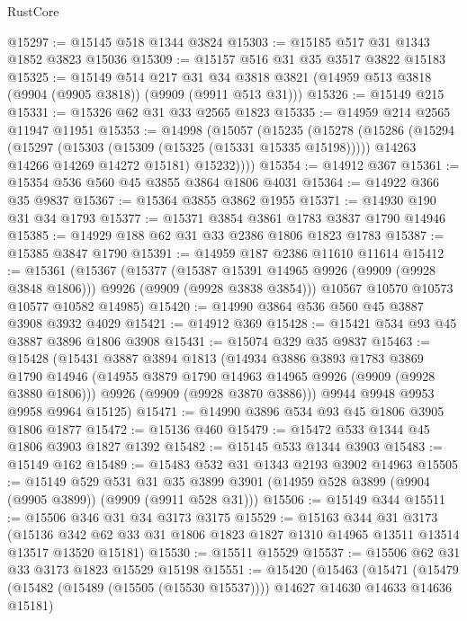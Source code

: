\begin{lexlean}{RustCore}
\begin{coremodule}
@15297 := @15145 @518 @1344 @3824
@15303 := @15185 @517 @31 @1343 @1852 @3823 @15036
@15309 := @15157 @516 @31 @35 @3517 @3822 @15183
@15325 := @15149
    @514
    @217
    @31
    @34
    @3818
    @3821
    (@14959 @513 @3818 (@9904 (@9905 @3818)) (@9909 (@9911 @513 @31)))
@15326 := @15149 @215
@15331 := @15326 @62 @31 @33 @2565 @1823
@15335 := @14959 @214 @2565 @11947 @11951
@15353 := @14998
    (@15057
      (@15235
        (@15278
          (@15286
            (@15294
              (@15297 (@15303 (@15309 (@15325 (@15331 @15335 @15198)))))
              @14263
              @14266
              @14269
              @14272
              @15181)
            @15232))))
@15354 := @14912 @367
@15361 := @15354 @536 @560 @45 @3855 @3864 @1806 @4031
@15364 := @14922 @366 @35 @9837
@15367 := @15364 @3855 @3862 @1955
@15371 := @14930 @190 @31 @34 @1793
@15377 := @15371 @3854 @3861 @1783 @3837 @1790 @14946
@15385 := @14929 @188 @62 @31 @33 @2386 @1806 @1823 @1783
@15387 := @15385 @3847 @1790
@15391 := @14959 @187 @2386 @11610 @11614
@15412 := @15361
    (@15367
      (@15377
        (@15387 @15391 @14965 @9926 (@9909 (@9928 @3848 @1806)))
        @9926
        (@9909 (@9928 @3838 @3854)))
      @10567
      @10570
      @10573
      @10577
      @10582
      @14985)
@15420 := @14990 @3864 @536 @560 @45 @3887 @3908 @3932 @4029
@15421 := @14912 @369
@15428 := @15421 @534 @93 @45 @3887 @3896 @1806 @3908
@15431 := @15074 @329 @35 @9837
@15463 := @15428
    (@15431
      @3887
      @3894
      @1813
      (@14934
        @3886
        @3893
        @1783
        @3869
        @1790
        @14946
        (@14955 @3879 @1790 @14963 @14965 @9926 (@9909 (@9928 @3880 @1806)))
        @9926
        (@9909 (@9928 @3870 @3886)))
      @9944
      @9948
      @9953
      @9958
      @9964
      @15125)
@15471 := @14990 @3896 @534 @93 @45 @1806 @3905 @1806 @1877
@15472 := @15136 @460
@15479 := @15472 @533 @1344 @45 @1806 @3903 @1827 @1392
@15482 := @15145 @533 @1344 @3903
@15483 := @15149 @162
@15489 := @15483 @532 @31 @1343 @2193 @3902 @14963
@15505 := @15149
    @529
    @531
    @31
    @35
    @3899
    @3901
    (@14959 @528 @3899 (@9904 (@9905 @3899)) (@9909 (@9911 @528 @31)))
@15506 := @15149 @344
@15511 := @15506 @346 @31 @34 @3173 @3175
@15529 := @15163
    @344
    @31
    @3173
    (@15136 @342 @62 @33 @31 @1806 @1823 @1827 @1310 @14965 @13511 @13514 @13517 @13520 @15181)
@15530 := @15511 @15529
@15537 := @15506 @62 @31 @33 @3173 @1823 @15529 @15198
@15551 := @15420
    (@15463
      (@15471
        (@15479 (@15482 (@15489 (@15505 (@15530 @15537)))) @14627 @14630 @14633 @14636 @15181)

\end{coremodule}
\end{lexlean}
